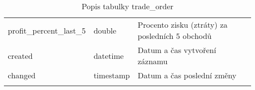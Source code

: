 \begin{center}
\begin{longtable}[h]{|l|C{4cm}|p{4cm}|}
        profit\_percent\_last\_5              & double                                                                                                                                                           & Procento zisku (ztráty) za posledních 5 obchodů                                                                                   \\
        created                               & datetime                                                                                                                                                         & Datum a čas vytvoření záznamu                                                                                                     \\
        changed                               & timestamp                                                                                                                                                        & Datum a čas poslední změny                                                                                                        \\
        \hline
        \caption*{Popis tabulky trade\_order}
        \label{tab:tradeOrder}
    \end{longtable}
\end{center}


